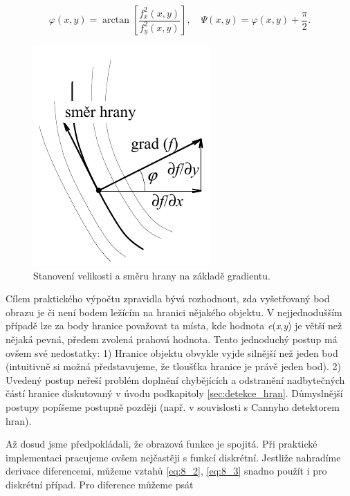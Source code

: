 \begin{equation} \label{eq:8_3}
    \varphi(x, y) = \arctan \left[ \frac{f_x^2(x, y)}{f_y^2(x, y)} \right], \quad \Psi(x, y) = \varphi(x, y) + \frac{\pi}{2} .
\end{equation}

\begin{figure}[th]
    \begin{center}
        \includegraphics[scale=1.0]{08_segmentace/images/img_8_3.pdf}
    \end{center}
    \caption{Stanovení velikosti a směru hrany na základě gradientu.}
    \label{img:8_3}
\end{figure}

Cílem praktického výpočtu zpravidla bývá rozhodnout, zda vyšetřovaný bod obrazu je či není bodem ležícím na hranici nějakého objektu. V nejjednodušším případě lze za body hranice považovat ta místa, kde hodnota \textit{e}(\textit{x},\textit{y}) je větší než nějaká pevná, předem zvolená prahová hodnota. Tento jednoduchý postup má ovšem své nedostatky: 1) Hranice objektu obvykle vyjde silnější než jeden bod (intuitivně si možná představujeme, že tloušťka hranice je právě jeden bod). 2) Uvedený postup neřeší problém doplnění chybějících a odstranění nadbytečných částí hranice diskutovaný v úvodu podkapitoly \ref{sec:detekce_hran}. Důmyslnější postupy popíšeme postupně později (např. v souvislosti s Cannyho detektorem hran).

Až dosud jsme předpokládali, že obrazová funkce je spojitá. Při praktické implementaci pracujeme ovšem nejčastěji s funkcí diskrétní. Jestliže nahradíme derivace diferencemi, můžeme vztahů \eqref{eq:8_2}, \eqref{eq:8_3} snadno použít i pro diskrétní případ. Pro diference můžeme psát

